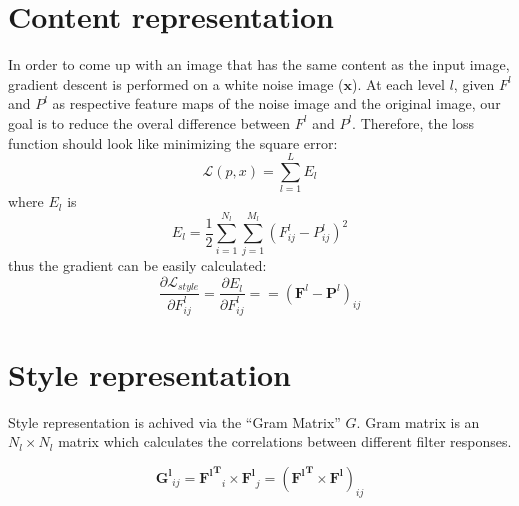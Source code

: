\documentclass{article}
\begin{document}
\section*{Content representation}
In order to come up with an image that has the same content as the input
image, gradient descent is performed on a white noise image ($\mathbf{x}$).
At each level $l$, given $F^l$ and $P^l$ as respective feature maps of the
noise image and the original image, our goal is to reduce the overal difference
between $F^l$ and $P^l$. Therefore, the loss function should look like 
minimizing the square error:
\begin{equation}
    \mathcal{L}(p, x) = \sum_{l=1}^{L} {E_l}
\end{equation}
where $E_l$ is
\begin{equation}
    {E_l} = \frac{1}{2} \sum_{i=1}^{N_l}\sum_{j=1}^{M_l}{(F^l_{ij} - P^l_{ij})^2}
\end{equation}
thus the gradient can be easily calculated:
\begin{equation}
    \frac{\partial \mathcal{L}_{style}}{\partial F^l_{ij}} = \frac{\partial E_l}{\partial F^l_{ij}} = 
    = (\mathbf{F}^l - \mathbf{P}^l)_{ij}
\end{equation}
\section*{Style representation}
Style representation is achived via the ``Gram Matrix'' $G$. Gram matrix is
an $N_l \times N_l$ matrix which calculates the correlations between
different filter responses.

\begin{equation}
    \mathbf{G^l}_{ij} = \mathbf{{F^l}^T}_i \times \mathbf{F^l}_j
    = (\mathbf{{F^l}^T} \times \mathbf{F^l})_{ij}
\end{equation}
\end{document}
